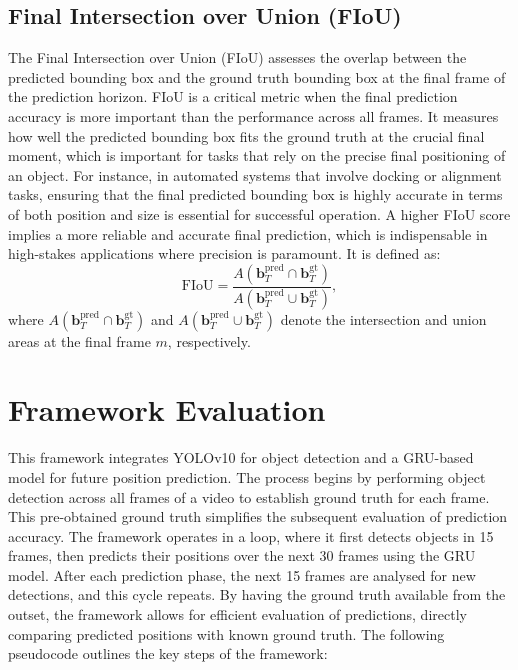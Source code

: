 \documentclass[12pt,oneside]{book} %
\begin{document}
\subsection*{Final Intersection over Union (FIoU)}
\noindent The Final Intersection over Union (FIoU) assesses the overlap between the
predicted bounding box and the ground truth bounding box at the final frame of
the prediction horizon. FIoU is a critical metric when the final prediction
accuracy is more important than the performance across all frames. It measures
how well the predicted bounding box fits the ground truth at the crucial final
moment, which is important for tasks that rely on the precise final positioning
of an object. For instance, in automated systems that involve docking or
alignment tasks, ensuring that the final predicted bounding box is highly
accurate in terms of both position and size is essential for successful
operation. A higher FIoU score implies a more reliable and accurate final
prediction, which is indispensable in high-stakes applications where precision
is paramount. It is defined as:
\begin{equation}
    \text{FIoU} = \frac{A(\mathbf{b}_T^{\text{pred}} \cap \mathbf{b}_T^{\text{gt}})}{A(\mathbf{b}_T^{\text{pred}} \cup \mathbf{b}_T^{\text{gt}})},
\end{equation}
where \(A(\mathbf{b}_T^{\text{pred}} \cap \mathbf{b}_T^{\text{gt}})\) and \(A(\mathbf{b}_T^{\text{pred}} \cup \mathbf{b}_T^{\text{gt}})\) denote the intersection and union areas at the final frame \(m\), respectively.

\newpage
\section{Framework Evaluation}
This framework integrates YOLOv10 for object detection and a GRU-based model
for future position prediction. The process begins by performing object
detection across all frames of a video to establish ground truth for each
frame. This pre-obtained ground truth simplifies the subsequent evaluation of
prediction accuracy. The framework operates in a loop, where it first detects
objects in 15 frames, then predicts their positions over the next 30 frames
using the GRU model. After each prediction phase, the next 15 frames are
analysed for new detections, and this cycle repeats. By having the ground truth
available from the outset, the framework allows for efficient evaluation of
predictions, directly comparing predicted positions with known ground truth.
The following pseudocode outlines the key steps of the framework:
\end{document}
